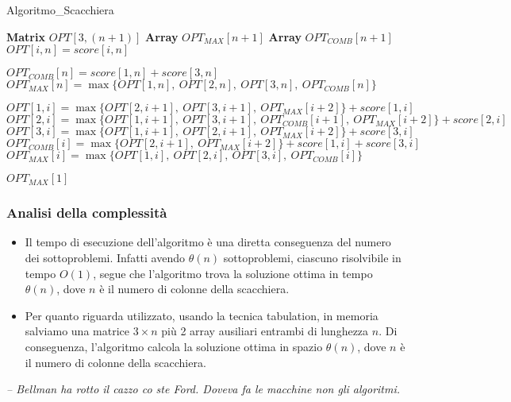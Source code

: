 \begin{algorithm}
	\caption{Algoritmo\_Scacchiera}
	\begin{algorithmic}[1]
		\State {}
		\State \textbf{Matrix} $OPT[3, (n + 1)]$ 
		\State \textbf{Array} $OPT_{MAX}[n + 1]$
		\State \textbf{Array} $OPT_{COMB}[n + 1]$ 
		\State {}
		\State $OPT[i, n] = score[i, n]$
		\EndFor
		
		\State $OPT_{COMB}[n] = score[1,n] + score[3,n]$
		\State $OPT_{MAX}[n] = \max\{OPT[1,n],\ OPT[2,n],\ OPT[3,n],\ OPT_{COMB}[n]\}$
		\State {}
		
		\State {}
		\State $OPT[1, i] = \max\{OPT[2, i + 1],\ OPT[3, i + 1],\ OPT_{MAX}[i + 2]\} + score[1, i]$\\
		
		\State $OPT[2, i] = \max\{OPT[1, i + 1],\ OPT[3, i + 1],\ OPT_{COMB}[i + 1],\ OPT_{MAX}[i + 2]\} + score[2, i]$\\
		
		\State $OPT[3, i] = \max\{OPT[1, i + 1],\ OPT[2, i + 1],\ OPT_{MAX}[i + 2]\} + score[3, i]$\\
		
		\State $OPT_{COMB}[i] = \max\{OPT[2, i + 1],\ OPT_{MAX}[i + 2]\} + score[1, i] + score[3, i]$\\
		
		\State $OPT_{MAX}[i] = \max\{OPT[1, i],\ OPT[2, i],\ OPT[3, i],\ OPT_{COMB}[i]\}$
		\EndFor
		
		\Return $OPT_{MAX}[1]$
		\EndFunction
	\end{algorithmic}
\end{algorithm}

\subsubsection*{Analisi della complessità}

\begin{itemize}
	\item{
		Il tempo di esecuzione dell'algoritmo è una diretta conseguenza del numero dei sottoproblemi. Infatti avendo $\theta(n)$ sottoproblemi,
		ciascuno risolvibile in tempo $O(1)$, segue che l'algoritmo trova la soluzione ottima in tempo $\theta(n)$, dove $n$ è il numero di colonne della scacchiera.
	}
	\item{
		Per quanto riguarda utilizzato, usando la tecnica tabulation, in memoria salviamo una matrice $3 \times n$ più 2 array ausiliari entrambi di lunghezza $n$.
		Di conseguenza, l'algoritmo calcola la soluzione ottima in spazio $\theta(n)$, dove $n$ è il numero di colonne della scacchiera. 
	}
\end{itemize}

\vspace{0.5cm} %
\begin{flushright}
    \textit{-- Bellman ha rotto il cazzo co ste Ford. Doveva fa le macchine non gli algoritmi.}
\end{flushright}
